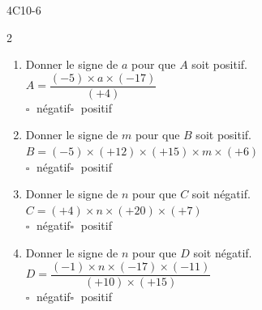 \begin{EXO}{}{4C10-6}
\begin{multicols}{2}
\begin{enumerate}[itemsep=2em]
	\item \begin{minipage}[t]{\linewidth} Donner le signe de $a$ pour que $A$ soit positif. \\$ A =  \dfrac {(-5)\times a\times (-17)}{(+4)} $ \\ 
    
    	$\square\;$ négatif\qquad $\square\;$ positif\qquad \\
 \end{minipage}
	\item \begin{minipage}[t]{\linewidth} Donner le signe de $m$ pour que $B$ soit positif. \\$ B =  (-5) \times (+12)\times (+15)\times m\times (+6) $ \\ 
    
    	$\square\;$ négatif\qquad $\square\;$ positif\qquad \\
 \end{minipage}
	\item \begin{minipage}[t]{\linewidth} Donner le signe de $n$ pour que $C$ soit négatif. \\$ C =  (+4) \times n\times (+20)\times (+7) $ \\ 
    
    	$\square\;$ négatif\qquad $\square\;$ positif\qquad \\
 \end{minipage}
	\item \begin{minipage}[t]{\linewidth} Donner le signe de $n$ pour que $D$ soit négatif. \\$ D =  \dfrac {(-1)\times n\times (-17)\times (-11)}{(+10)\times (+15)} $ \\ 
    
    	$\square\;$ négatif\qquad $\square\;$ positif\qquad \\
 \end{minipage}
\end{enumerate}
\end{multicols}
\end{EXO}

